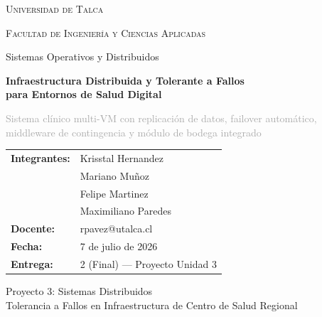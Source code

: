 \documentclass[11pt,a4paper]{article}
\begin{document}
\begin{titlepage}
    \centering
    \vspace*{1.5cm}
    {\scshape\Large Universidad de Talca \par}
    {\scshape\large Facultad de Ingeniería y Ciencias Aplicadas \par}
    \vspace{0.4cm}
    {\large Sistemas Operativos y Distribuidos \par}
    \vspace{1.5cm}
    {\huge\bfseries\color{navy}
        Infraestructura Distribuida y Tolerante a Fallos\\[0.4cm]
        para Entornos de Salud Digital \par}
    \vspace{0.8cm}
    {\large\textcolor{darkgray}{
        Sistema clínico multi-VM con replicación de datos, failover automático,
        middleware de contingencia y módulo de bodega integrado} \par}
    \vspace{2.5cm}

    \begin{tabular}{p{4cm}l}
        \textbf{Integrantes:} & Krisstal Hernandez \\
                              & Mariano Muñoz \\
                              & Felipe Martinez \\
                              & Maximiliano Paredes \\[0.3cm]
        \textbf{Docente:}     & rpavez@utalca.cl \\[0.2cm]
        \textbf{Fecha:}       & 7 de julio de 2026 \\[0.2cm]
        \textbf{Entrega:}     & 2 (Final) — Proyecto Unidad 3
    \end{tabular}

    \vfill
    \begin{center}
        \small\sffamily\color{darkgray}
        Proyecto 3: Sistemas Distribuidos\\
        Tolerancia a Fallos en Infraestructura de Centro de Salud Regional
    \end{center}
\end{titlepage}

\newpage
\tableofcontents
\newpage
\end{document}
